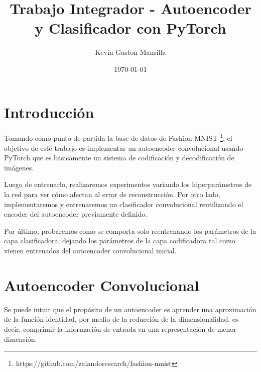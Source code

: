 \documentclass[aps,prl,reprint,groupedaddress]{revtex4-2}
\begin{document}
\title{
Trabajo Integrador - Autoencoder y Clasificador con PyTorch
}

\author{Kevin Gaston Mansilla}

\affiliation{}

\date{\today}

\begin{abstract}
\end{abstract}


\maketitle

\section{Introducción}

Tomando como punto de partida la base de datos de Fashion MNIST
\footnote{https://github.com/zalandoresearch/fashion-mnist}, el objetivo de 
este trabajo es implementar un autoencoder convolucional usando PyTorch \cite{NEURIPS2019_9015} 
que es básicamente un sistema de codificación y decodificación de imágenes.

Luego de entrenarlo, realizaremos experimentos variando los 
hiperparámetros de la red para ver cómo afectan al error de reconstrucción. 
Por otro lado, implementaremos y entrenaremos un clasificador convolucional 
reutilizando el encoder del autoencoder previamente definido. 

Por último, probaremos como se comporta solo reentrenando los parámetros de la 
capa clasificadora, dejando los parámetros de la capa codificadora tal 
como vienen entrenados del autoencoder convolucional inicial.

\section{Autoencoder Convolucional}
Se puede intuir que el propósito de un autoencoder es aprender una aproximación 
de la función identidad, por medio de la reducción de la dimensionalidad,
es decir, comprimir la información de entrada en una representación de menor
dimensión.
\end{document}

